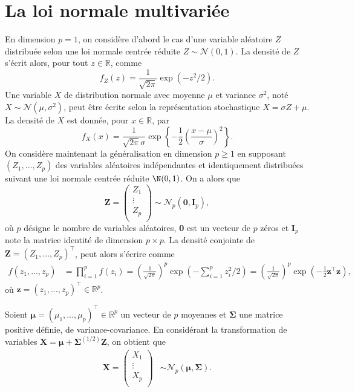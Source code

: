 \chapter{La loi normale multivariée}
\label{chap:multnorm}

En dimension $p=1$, on considère d'abord le cas d'une variable aléatoire $Z$ distribuée selon une loi normale centrée réduite $Z\sim\mathcal{N}(0,1)$. La densité de $Z$ s'écrit alors, pour tout $z\in\mathbb{R}$, comme
$$
f_Z(z) = \frac{1}{\sqrt{2\pi}} \exp(-z^2/2).
$$
Une variable $X$ de distribution normale avec moyenne $\mu$ et variance $\sigma^2$, noté $X \sim \mathcal{N} (\mu,\sigma^2)$, peut être écrite selon la représentation stochastique $X=\sigma Z+\mu$. La densité de $X$ est donnée, pour $x\in\mathbb{R}$, par
$$
f_X(x) =  \frac{1}{\sqrt{2\pi} \sigma} \exp\left\{-\frac{1}{2} \left(\frac{x- \mu}{\sigma}\right)^2\right\}.
$$
%
On considère maintenant la généralisation en dimension $p\ge 1$ en supposant $(Z_1, \ldots, Z_p)$ des variables aléatoires indépendantes et identiquement distribuées suivant une loi normale centrée réduite $\N(0,1)$. On a alors que
$$
\mathbf{Z} = \begin{pmatrix}
Z_1 \\
\vdots \\
Z_p \\
\end{pmatrix} \sim \mathcal{N}_p (\textbf{0}, \mathbf{I}_p),
$$
où $p$ désigne le nombre de variables aléatoires, \textbf{0} est un vecteur de $p$ zéros et $\mathbf{I}_p$ note la matrice identité de dimension $p \times p$. La densité conjointe de $\mathbf{Z} = (Z_1, \ldots, Z_p)^\top$, peut alors s'écrire comme
\begin{align*}
 f(z_1, ..., z_p) &= \prod_{i=1}^p f(z_i)= \left(\frac{1}{\sqrt{2\pi}}\right)^p \exp\left(-\sum_{i=1}^p z_i^2/2\right)= \left(\frac{1}{\sqrt{2\pi}}\right)^p \exp\left(-\frac{1}{2} \mathbf{z}^\top\mathbf{z}\right),
\end{align*}
où $\mathbf{z} = (z_1,\ldots,z_p)^\top \in \mathbb{R}^p$.

Soient $\boldsymbol{\mu} = (\mu_1,\ldots, \mu_p)^\top \in \mathbb{R}^p$ un vecteur de $p$ moyennes et $\boldsymbol{\Sigma}$ une matrice positive définie, de variance-covariance. En considérant la transformation de variables $\mathbf{X}=\boldsymbol{\mu}+ \boldsymbol{\Sigma}^{(1/2)}\mathbf{Z}$, on obtient que
\begin{align*}
\mathbf{X} = \begin{pmatrix}
X_1 \\
\vdots \\
X_p \\
\end{pmatrix} &\sim \mathcal{N}_p (\boldsymbol{\mu}, \boldsymbol{\Sigma}).
\end{align*}


